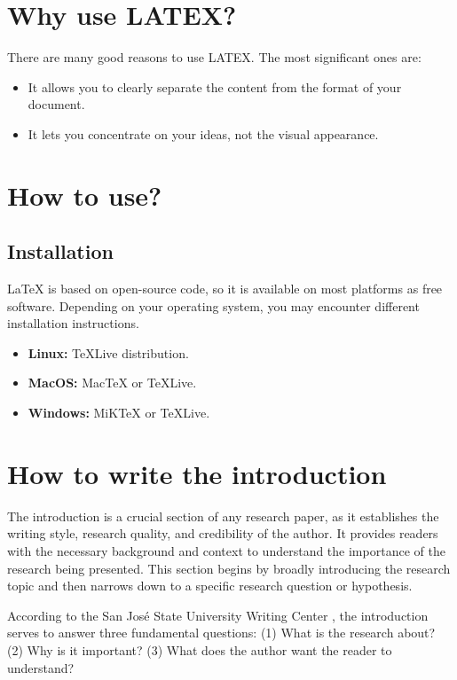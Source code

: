 \section{Why use LATEX?}
There are many good reasons to use LATEX. The most significant ones are:
\begin{itemize}
	\item It allows you to clearly separate the content from the format of your document.
	\item It lets you concentrate on your ideas, not the visual appearance.
\end{itemize}

\section{How to use?}
\subsection{Installation}
LaTeX is based on open-source code, so it is available on most platforms as free software. Depending on your operating system, you may encounter different installation instructions.

\begin{itemize}
	\item \textbf{Linux:} TeXLive distribution.
	\item \textbf{MacOS:} MacTeX or TeXLive.
	\item \textbf{Windows:} MiKTeX or TeXLive.
\end{itemize}

\section{How to write the introduction}
The introduction is a crucial section of any research paper, as it establishes the writing style, research quality, and credibility of the author. It provides readers with the necessary background and context to understand the importance of the research being presented. This section begins by broadly introducing the research topic and then narrows down to a specific research question or hypothesis. 

According to the San José State University Writing Center \cite{SJSUWritingCenterIntroduction}, the introduction serves to answer three fundamental questions: (1) What is the research about? (2) Why is it important? (3) What does the author want the reader to understand? 

